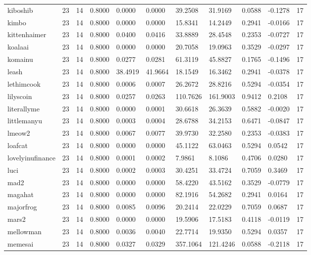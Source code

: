\begin{table}[htbp]
\begin{tabular}{lllllllllll}
kiboshib & 23 & 14 & 0.8000 & 0.0000 & 0.0000 & 39.2508 & 31.9169 & 0.0588 & -0.1278 & 17 \\
kimbo & 23 & 14 & 0.8000 & 0.0000 & 0.0000 & 15.8341 & 14.2449 & 0.2941 & -0.0166 & 17 \\
kittenhaimer & 23 & 14 & 0.8000 & 0.0400 & 0.0416 & 33.8889 & 28.4548 & 0.2353 & -0.0727 & 17 \\
koalaai & 23 & 14 & 0.8000 & 0.0000 & 0.0000 & 20.7058 & 19.0963 & 0.3529 & -0.0297 & 17 \\
komainu & 23 & 14 & 0.8000 & 0.0277 & 0.0281 & 61.3119 & 45.8827 & 0.1765 & -0.1496 & 17 \\
leash & 23 & 14 & 0.8000 & 38.4919 & 41.9664 & 18.1549 & 16.3462 & 0.2941 & -0.0378 & 17 \\
lethimcook & 23 & 14 & 0.8000 & 0.0006 & 0.0007 & 26.2672 & 28.8216 & 0.5294 & -0.0354 & 17 \\
lilyscoin & 23 & 14 & 0.8000 & 0.0257 & 0.0263 & 110.7626 & 161.9003 & 0.9412 & 0.2108 & 17 \\
literallyme & 23 & 14 & 0.8000 & 0.0000 & 0.0001 & 30.6618 & 26.3639 & 0.5882 & -0.0020 & 17 \\
littlemanyu & 23 & 14 & 0.8000 & 0.0003 & 0.0004 & 28.6788 & 34.2153 & 0.6471 & -0.0847 & 17 \\
lmeow2 & 23 & 14 & 0.8000 & 0.0067 & 0.0077 & 39.9730 & 32.2580 & 0.2353 & -0.0383 & 17 \\
loafcat & 23 & 14 & 0.8000 & 0.0000 & 0.0000 & 45.1122 & 63.0463 & 0.5294 & 0.0542 & 17 \\
lovelyinufinance & 23 & 14 & 0.8000 & 0.0001 & 0.0002 & 7.9861 & 8.1086 & 0.4706 & 0.0280 & 17 \\
luci & 23 & 14 & 0.8000 & 0.0002 & 0.0003 & 30.4251 & 33.4724 & 0.7059 & 0.3469 & 17 \\
mad2 & 23 & 14 & 0.8000 & 0.0000 & 0.0000 & 58.4220 & 43.5162 & 0.3529 & -0.0779 & 17 \\
magahat & 23 & 14 & 0.8000 & 0.0000 & 0.0000 & 82.1916 & 54.2682 & 0.2941 & 0.0164 & 17 \\
majorfrog & 23 & 14 & 0.8000 & 0.0085 & 0.0096 & 20.2414 & 22.0229 & 0.7059 & 0.0687 & 17 \\
mars2 & 23 & 14 & 0.8000 & 0.0000 & 0.0000 & 19.5906 & 17.5183 & 0.4118 & -0.0119 & 17 \\
mellowman & 23 & 14 & 0.8000 & 0.0036 & 0.0040 & 22.7714 & 19.9350 & 0.5294 & 0.0357 & 17 \\
memesai & 23 & 14 & 0.8000 & 0.0327 & 0.0329 & 357.1064 & 121.4246 & 0.0588 & -0.2118 & 17 \\

\end{tabular}
\end{table}
